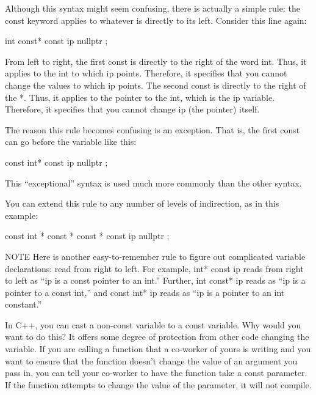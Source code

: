 Although this syntax might seem confusing, there is actually a simple rule: the const keyword applies to whatever is directly to its left. Consider this line again:

\begin{cpp}
int const* const ip { nullptr };
\end{cpp}

From left to right, the first const is directly to the right of the word int. Thus, it applies to the int to which ip points. Therefore, it specifies that you cannot change the values to which ip points. The second const is directly to the right of the *. Thus, it applies to the pointer to the int, which is the ip variable. Therefore, it specifies that you cannot change ip (the pointer) itself.

The reason this rule becomes confusing is an exception. That is, the first const can go before the variable like this:

\begin{cpp}
const int* const ip { nullptr };
\end{cpp}

This “exceptional” syntax is used much more commonly than the other syntax.

You can extend this rule to any number of levels of indirection, as in this example:

\begin{cpp}
const int * const * const * const ip { nullptr };
\end{cpp}

\begin{myNotic}{NOTE}
Here is another easy-to-remember rule to figure out complicated variable declarations: read from right to left. For example, int* const ip reads from right to left as “ip is a const pointer to an int.” Further, int const* ip reads as “ip is a pointer to a const int,” and const int* ip reads as “ip is a pointer to an int constant.”
\end{myNotic}


In C++, you can cast a non-const variable to a const variable. Why would you want to do this? It offers some degree of protection from other code changing the variable. If you are calling a function that a co-worker of yours is writing and you want to ensure that the function doesn’t change the value of an argument you pass in, you can tell your co-worker to have the function take a const parameter. If the function attempts to change the value of the parameter, it will not compile.

